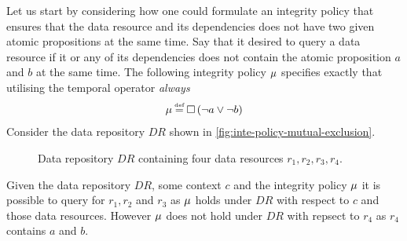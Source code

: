 \begin{example}[]\label{ex:mutual-exclusion}
Let us start by considering how one could formulate an integrity policy that ensures that the data resource and its dependencies does not have two given atomic propositions at the same time. Say that it desired to query a data resource if it or any of its dependencies does not contain the atomic proposition $a$ and $b$ at the same time. The following integrity policy $\mu$ specifies exactly that utilising the temporal operator \emph{always}
\begin{align*}
    \inte \eqdef  \G \left( \lnot a \lor \lnot b \right)
\end{align*}
Consider the data repository $DR$ shown in \autoref{fig:inte-policy-mutual-exclusion}.
\begin{figure}[!ht]
    \begin{center}
        
        \caption{Data repository $DR$ containing four data resources $r_1, r_2, r_3, r_4$.}
        \label{fig:inte-policy-mutual-exclusion}
    \end{center}
\end{figure}
Given the data repository $DR$, some context $c$ and the integrity policy $\mu$ it is possible to query for $r_1, r_2$ and $r_3$ as $\mu$ holds under $DR$ with respect to $c$ and those data resources. However $\mu$ does not hold under $DR$ with repsect to $r_4$ as $r_4$ contains $a$ and $b$.
\end{example}

